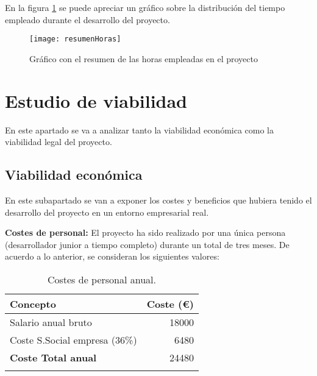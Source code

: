 En la figura \ref{fig:resumenHoras} se puede apreciar un gráfico sobre la distribución del tiempo empleado durante el desarrollo del proyecto.

\begin{figure}%
		\centering
		\texttt{[image: resumenHoras]}
		\caption{Gráfico con el resumen de las horas empleadas en el proyecto}\label{fig:resumenHoras}
	\end{figure}

\section{Estudio de viabilidad}
En este apartado se va a analizar tanto la viabilidad económica como la viabilidad legal del proyecto.


\subsection{Viabilidad económica} 
En este subapartado se van a exponer los costes y beneficios que hubiera tenido el desarrollo del proyecto en un entorno empresarial real. 

\textbf{Costes de personal:}
El proyecto ha sido realizado por una única persona (desarrollador junior a tiempo completo) durante un total de tres meses.
De acuerdo a lo anterior, se consideran los siguientes valores:

\begin{longtable}[]{@{}lr@{}}
\toprule
\begin{minipage}[b]{0.38\columnwidth}\raggedright\strut
\textbf{Concepto}\strut
\end{minipage} & \begin{minipage}[b]{0.20\columnwidth}\raggedleft\strut
\textbf{Coste (\euro{}) }\strut
\end{minipage}\tabularnewline
\midrule
\endhead

\begin{minipage}[t]{0.38\columnwidth}\raggedright\strut
Salario anual bruto\strut
\end{minipage} & \begin{minipage}[t]{0.20\columnwidth}\raggedleft\strut
{18000}\strut
\end{minipage}\tabularnewline

\begin{minipage}[t]{0.38\columnwidth}\raggedright\strut
Coste S.Social empresa (36\%)\strut
\end{minipage} & \begin{minipage}[t]{0.20\columnwidth}\raggedleft\strut
6480\strut
\end{minipage}\tabularnewline

\midrule
\begin{minipage}[t]{0.38\columnwidth}\raggedright\strut
\textbf{Coste Total anual}\strut
\end{minipage} & \begin{minipage}[t]{0.20\columnwidth}\raggedleft\strut
24480\strut
\end{minipage}\tabularnewline
\bottomrule
\caption{Costes de personal anual.}
\end{longtable}

